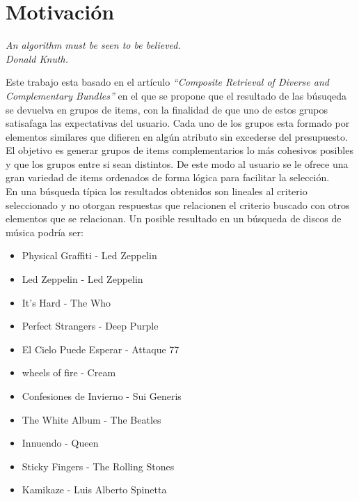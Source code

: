 \section{Motivación}
{\begin{small}%
\begin{flushright}%
\it An algorithm must be seen to be believed.\\Donald Knuth.
\end{flushright}%
\end{small}%
\vspace{.5cm}}
Este trabajo esta basado en el artículo \textit{\textquotedblleft Composite Retrieval of Diverse 
and Complementary Bundles\textquotedblright}\cite{compositeRetrival} en el que se propone 
que el resultado de las búsuqeda se devuelva en grupos de items, con la finalidad de que uno de estos grupos satisafaga
las expectativas del usuario. Cada uno de los grupos esta formado por elementos similares que difieren en algún atributo sin excederse del presupuesto.
El objetivo es generar grupos de items complementarios lo más cohesivos posibles y que los grupos entre si sean distintos.
De este modo al usuario se le ofrece una gran variedad de items ordenados de forma lógica para facilitar la selección.\\

En una búsqueda típica los resultados obtenidos son lineales al criterio seleccionado y no otorgan respuestas que relacionen 
el criterio buscado con otros elementos que se relacionan. Un posible resultado en un búsqueda de discos de música podría ser:\\
\begin{itemize}
  \item Physical Graffiti - Led Zeppelin
  \item Led Zeppelin - Led Zeppelin
  \item It's Hard - The Who
  \item Perfect Strangers - Deep Purple
	\item El Cielo Puede Esperar - Attaque 77
  \item wheels of fire - Cream
	\item Confesiones de Invierno - Sui Generis
  \item The White Album - The Beatles
  \item Innuendo - Queen
  \item Sticky Fingers - The Rolling Stones
	\item Kamikaze - Luis Alberto Spinetta
\end{itemize}

